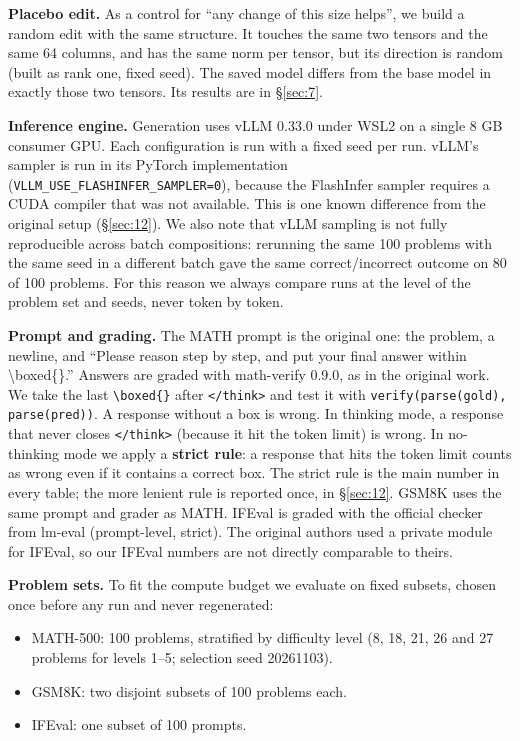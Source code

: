 \documentclass[11pt]{article}
\begin{document}
\textbf{Placebo edit.} As a control for ``any change of this size helps'', we build a random edit with the same structure. It touches the same two tensors and the same 64 columns, and has the same norm per tensor, but its direction is random (built as rank one, fixed seed). The saved model differs from the base model in exactly those two tensors. Its results are in \S\ref{sec:7}.

\textbf{Inference engine.} Generation uses vLLM 0.33.0 under WSL2 on a single 8 GB consumer GPU. Each configuration is run with a fixed seed per run. vLLM's sampler is run in its PyTorch implementation (\texttt{VLLM\_\allowbreak{}USE\_\allowbreak{}FLASHINFER\_\allowbreak{}SAMPLER=0}), because the FlashInfer sampler requires a CUDA compiler that was not available. This is one known difference from the original setup (\S\ref{sec:12}). We also note that vLLM sampling is not fully reproducible across batch compositions: rerunning the same 100 problems with the same seed in a different batch gave the same correct/incorrect outcome on 80 of 100 problems. For this reason we always compare runs at the level of the problem set and seeds, never token by token.

\textbf{Prompt and grading.} The MATH prompt is the original one: the problem, a newline, and ``Please reason step by step, and put your final answer within \textbackslash{}boxed\{\}.'' Answers are graded with math-verify 0.9.0, as in the original work. We take the last \texttt{\textbackslash{}boxed\{\}} after \texttt{\textless{}/think\textgreater{}} and test it with \texttt{verify(parse(gold), parse(pred))}. A response without a box is wrong. In thinking mode, a response that never closes \texttt{\textless{}/think\textgreater{}} (because it hit the token limit) is wrong. In no-thinking mode we apply a \textbf{strict rule}: a response that hits the token limit counts as wrong even if it contains a correct box. The strict rule is the main number in every table; the more lenient rule is reported once, in \S\ref{sec:12}. GSM8K uses the same prompt and grader as MATH. IFEval is graded with the official checker from lm-eval (prompt-level, strict). The original authors used a private module for IFEval, so our IFEval numbers are not directly comparable to theirs.

\textbf{Problem sets.} To fit the compute budget we evaluate on fixed subsets, chosen once before any run and never regenerated:

\begin{itemize}[nosep,leftmargin=*]
\item MATH-500: 100 problems, stratified by difficulty level (8, 18, 21, 26 and 27 problems for levels 1--5; selection seed 20261103).
\item GSM8K: two disjoint subsets of 100 problems each.
\item IFEval: one subset of 100 prompts.
\end{itemize}
\end{document}
